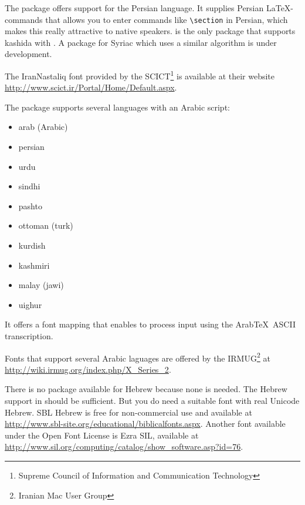 The package \cite{xepersian} offers support
for the Persian language. It supplies Persian \LaTeX-commands that allows
you to enter commands like \verb|\section| in Persian, which makes this
really attractive to native speakers.  is the only package
that supports kashida with . A package for
Syriac which uses a similar algorithm is under development.

The IranNastaliq font provided by the SCICT\footnote{Supreme Council of
Information and Communication Technology} is available at their website
\url{http://www.scict.ir/Portal/Home/Default.aspx}. 

The \cite{arabxetex} package supports several languages with
an Arabic script:

\begin{itemize}
\item arab (Arabic)
\item persian
\item urdu
\item sindhi
\item pashto
\item ottoman (turk)
\item kurdish
\item kashmiri
\item malay (jawi)
\item uighur
\end{itemize}

It offers a font mapping that enables  to process input
using the Arab\TeX\ ASCII transcription.

Fonts that support several Arabic laguages are offered by the
IRMUG\footnote{Iranian Mac User Group} at
\url{http://wiki.irmug.org/index.php/X_Series_2}.

There is no package available for Hebrew because none is
needed. The Hebrew support in  should be sufficient. But
you do need a suitable font with real Unicode Hebrew. SBL Hebrew is free for
non-commercial use and available at
\url{http://www.sbl-site.org/educational/biblicalfonts.aspx}. Another font
available under the Open Font License is Ezra SIL, available at
\url{http://www.sil.org/computing/catalog/show_software.asp?id=76}.

